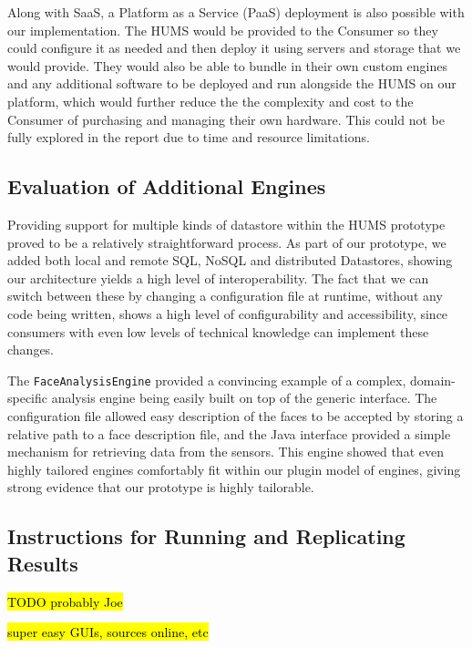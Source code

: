 \documentclass[10pt,a4paper]{article}
\begin{document}
Along with SaaS, a Platform as a Service (PaaS) deployment is also possible with our implementation. The HUMS would be provided to the Consumer so they could configure it as needed and then deploy it using servers and storage that we would provide. They would also be able to bundle in their own custom engines and any additional software to be deployed and run alongside the HUMS on our platform, which would further reduce the the complexity and cost to the Consumer of purchasing and managing their own hardware. This could not be fully explored in the report due to time and resource limitations.


\subsection{Evaluation of Additional Engines}
\label{sec:additional}

Providing support for multiple kinds of datastore within the HUMS prototype proved to be a relatively straightforward process. As part of our prototype, we added both local and remote SQL, NoSQL and distributed Datastores, showing our architecture yields a high level of interoperability. The fact that we can switch between these by changing a configuration file at runtime, without any code being written, shows a high level of configurability and accessibility, since consumers with even low levels of technical knowledge can implement these changes.
 
The \texttt{FaceAnalysisEngine} provided a convincing example of a complex, domain-specific analysis engine being easily built on top of the generic interface. The configuration file allowed easy description of the faces to be accepted by storing a relative path to a face description file, and the Java interface provided a simple mechanism for retrieving data from the sensors. This engine showed that even highly tailored engines comfortably fit within our plugin model of engines, giving strong evidence that our prototype is highly tailorable.


\subsection{Instructions for Running and Replicating Results}
\label{sec:instructions}

\hl{TODO probably Joe}

\hl{super easy GUIs, sources online, etc}
\end{document}
